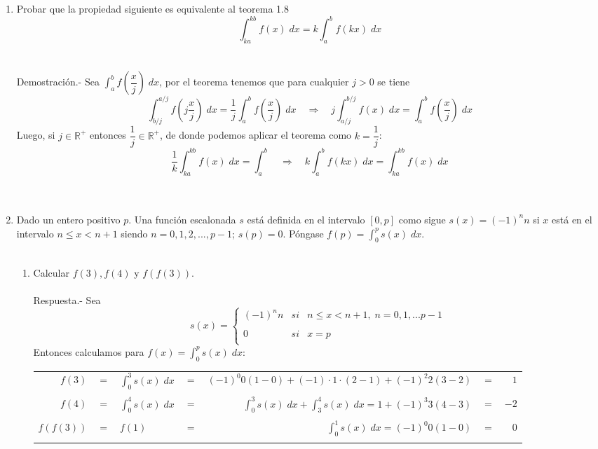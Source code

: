 \begin{enumerate}[ \bfseries 1.]
    \item Probar que la propiedad siguiente es equivalente al teorema 1.8 $$\displaystyle\int_{ka}^{kb} f(x) \; dx = k \int_{a}^{b} f(kx) \; dx$$\\\\
	Demostración.-\; Sea $\displaystyle\int_{a}^{b} f\left(\dfrac{x}{j}\right) \; dx$, por el teorema tenemos que para cualquier $j>0$ se tiene $$\displaystyle\int_{b/j}^{a/j}f\left(j\dfrac{x}{j}\right)\; dx = \dfrac{1}{j} \int_{a}^{b} f \left(\dfrac{x}{j}\right) \; dx \quad \Rightarrow \quad j\int_{a/j}^{b/j} f(x) \; dx = \int_{a}^{b} f\left(\dfrac{x}{j} \right) \; dx$$ Luego, si $j \in \mathbb{R}^+$ entonces $\dfrac{1}{j}\in \mathbb{R}^+$, de donde podemos aplicar el teorema como $k=\dfrac{1}{j}$: $$\dfrac{1}{k}\displaystyle\int_{ka}^{kb} f(x)\; dx = \int_{a}^{b} \quad \Rightarrow \quad k \int_{a}^{b} f(kx) \; dx = \int_{ka}^{kb} f(x) \; dx$$\\\\

    \item Dado un entero positivo $p$. Una función escalonada $s$ está definida en el intervalo $[0,p]$ como sigue $s(x)=(-1)^n n$ si $x$ está en el intervalo $n\leq x < n+1$ siendo $n=0,1,2,...,p-1$; $s(p)=0$. Póngase $f(p)=\displaystyle\int_{0}^{p} s(x)\; dx.$\\\\

    \begin{enumerate}[\bfseries (a)]

	\item Calcular $f(3), f(4)$ y $f(f(3))$.\\\\
	    Respuesta.-\; Sea $$s(x) = \left\{ \begin{array}{lcl}
		(-1)^n n&si&n\leq x < n+1, \; n=0,1,...p-1\\
		\\0& si &x=p\\
	    \end{array}\right.$$
	    Entonces calculamos para $f(x)=\displaystyle\int_{0}^{p} s(x)\; dx$:
	    \begin{center}
	    \begin{tabular}{rclcrcr}
		$f(3)$ & $=$ & $\displaystyle\int_{0}^{3} s(x) \; dx$ & $=$ & $(-1)^0 0 (1-0) + (-1)\cdot 1\cdot(2-1) + (-1)^2 2 (3-2)$ & $=$ & $1$\\\\
		$f(4)$ & $=$ & $\displaystyle\int_{0}^{4} s(x) \; dx$ &$=$ & $\displaystyle\int_{0}^{3} s(x) \;dx + \int_{3}^{4} s(x) \; dx = 1 + (-1)^3 3 (4-3)$&$=$&$-2$\\\\
		$f(f(3))$&$=$&$f(1)$&$=$&$\displaystyle\int_{0}^{1} s(x) \; dx = (-1)^0 0 (1-0)$&$=$&$0$\\\\
	    \end{tabular}
	    \end{center}


\end{enumerate}
\end{enumerate}
